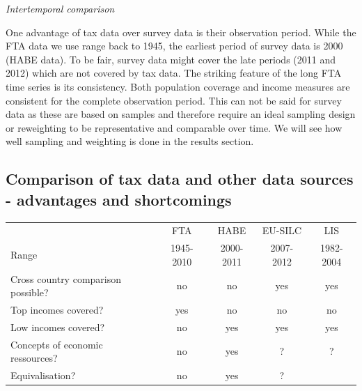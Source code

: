 \documentclass[twoside]{article}\usepackage[]{graphicx}\usepackage[]{color}
\begin{document}
\begin{multicols}{2}
\emph{Intertemporal comparison}

One advantage of tax data over survey data is their observation period. While the FTA data we use range back to 1945, the earliest period of survey data is 2000 (HABE data). To be fair, survey data might cover the late periods (2011 and 2012) which are not covered by tax data. The striking feature of the long FTA time series is its consistency. Both population coverage and income measures are consistent for the complete observation period. This can not be said for survey data as these are based on samples and therefore require an ideal sampling design or reweighting to be representative and comparable over time. We will see how well sampling and weighting is done in the results section.

\subsection{Comparison of tax data and other data sources - advantages and shortcomings}



\begin{table}[h]
\begin{tabular}{lcccc}
                                   & FTA       & HABE      & EU-SILC   & LIS       \\
Range                              & 1945-2010 & 2000-2011 & 2007-2012 & 1982-2004 \\
Cross country comparison possible? & no        & no        & yes       & yes       \\
Top incomes covered?               & yes       & no        & no        & no        \\
Low incomes covered?               & no        & yes       & yes       & yes       \\
Concepts of economic ressources?   & no        & yes       & ?         & ?         \\
Equivalisation?                    & no        & yes       & ?         &          
\end{tabular}
\end{table}


\end{multicols}
\end{document}
